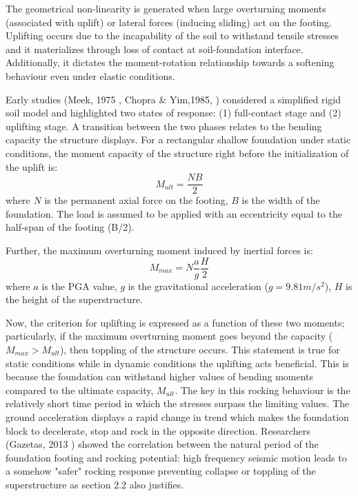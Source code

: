 \documentclass[12pt,a4paper]{report}
\begin{document}
The geometrical non-linearity is generated when large overturning moments (associated with uplift) or lateral forces (inducing sliding) act on the footing. Uplifting occurs due to the incapability of the soil to withstand tensile stresses and it materializes through loss of contact at soil-foundation interface. Additionally, it dictates the moment-rotation relationship towards a softening behaviour even under elastic conditions.

Early studies (Meek, 1975 \cite{meek1975effects}, Chopra \& Yim,1985,  \cite{chopra1985simplified}) considered a simplified rigid soil model and highlighted two states of response: (1) full-contact stage and (2) uplifting stage. A transition between the two phases relates to the bending capacity the structure displays. For a rectangular shallow foundation under static conditions, the moment capacity of the structure right before the initialization of the uplift is:
\begin{equation}
	M_{ult}= \frac{N B}{2}
\end{equation}
 where $N$ is the permanent axial force on the footing, $B$ is the width of the foundation. The load is assumed to be applied with an eccentricity equal to the half-span of the footing (B/2). 
 
 Further, the maximum overturning moment induced by inertial forces is:
 \begin{equation}
 	M_{max}= N \frac{a}{g}\frac{H}{2}
 \end{equation}
where $a$ is the PGA value, $g$ is the gravitational acceleration ($g=9.81m/s^2$), $H$ is the height of the superstructure.

Now, the criterion for uplifting is expressed as a function of these two moments; particularly, if the maximum overturning moment goes beyond the capacity ($M_{max}>M_{ult}$), then toppling of the structure occurs. This statement is true for static conditions while in dynamic conditions the uplifting acts beneficial. This is because the foundation can withstand higher values of bending moments compared to the ultimate capacity, $M_{ult}$. The key in this rocking behaviour is the relatively short time period in which the stresses surpass the limiting values. The ground acceleration displays a rapid change in trend which makes the foundation block to decelerate, stop and rock in the opposite direction. Researchers (Gazetas, 2013 \cite{gazetas2013can}) showed the correlation between the natural period of the foundation footing and rocking potential: high frequency seismic motion leads to a somehow "safer" rocking response preventing collapse or toppling of the superstructure as section 2.2 also justifies.
\end{document}
